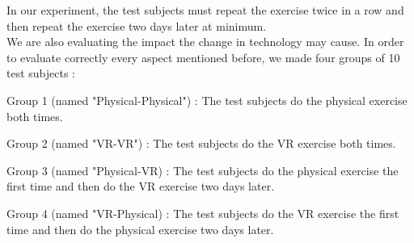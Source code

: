 \documentclass[12pt, openany, twocolumn]{article}
\begin{document}
    In our experiment, the test subjects must repeat the exercise twice in a row and then repeat the exercise two days later at minimum. \\

    We are also evaluating the impact the change in technology may cause.
    In order to evaluate correctly every aspect mentioned before, we made four groups of 10 test subjects :\\
    \begin{description}
        \item{Group 1 (named "Physical-Physical") :} The test subjects do the physical exercise both times. \\
        \item{Group 2 (named "VR-VR") :} The test subjects do the VR exercise both times. \\
        \item{Group 3 (named "Physical-VR) :} The test subjects do the physical exercise the first time and then do the VR exercise two days later. \\
        \item{Group 4 (named "VR-Physical) :} The test subjects do the VR exercise the first time and then do the physical exercise two days later. \\ 
    \end{description}

    



\end{document}
